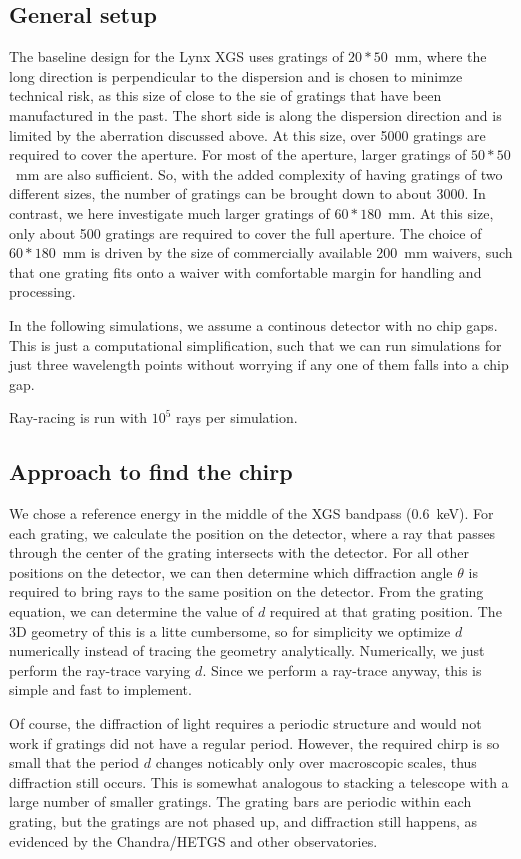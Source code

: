 \documentclass[]{spie}  %
\begin{document}
\subsection{General setup}
The baseline design for the Lynx XGS uses gratings of $20 * 50$~mm, where the long direction is perpendicular to the dispersion and is chosen to minimze technical risk, as this size of close to the sie of gratings that have been manufactured in the past. The short side is along the dispersion direction and is limited by the aberration discussed above. At this size, over 5000 gratings are required to cover the aperture. For most of the aperture, larger gratings of $50*50$~mm are also sufficient\cite{CATXGS}. So, with the added complexity of having gratings of two different sizes, the number of gratings can be brought down to about 3000. In contrast, we here investigate much larger gratings of $60 * 180$~mm. At this size, only about 500 gratings are required to cover the full aperture. The choice of $60 * 180$~mm is driven by the size of commercially available 200~mm waivers, such that one grating fits onto a waiver with comfortable margin for handling and processing.

In the following simulations, we assume a continous detector with no chip gaps. This is just a computational simplification, such that we can run simulations for just three wavelength points without worrying if any one of them falls into a chip gap.

Ray-racing is run with $10^5$ rays per simulation.


\subsection{Approach to find the chirp}
We chose a reference energy in the middle of the XGS bandpass (0.6~keV). 
For each grating, we calculate the position on the detector, where a ray that passes through the center of the grating intersects with the detector. For all other positions on the detector, we can then determine which diffraction angle $\theta$ is required to bring rays to the same position on the detector. From the grating equation, we can determine the value of $d$ required at that grating position. The 3D geometry of this is a litte cumbersome, so for simplicity we optimize $d$ numerically instead of tracing the geometry analytically. Numerically, we just perform the ray-trace varying $d$. Since we perform a ray-trace anyway, this is simple and fast to implement.

Of course, the diffraction of light requires a periodic structure and would not work if gratings did not have a regular period. However, the required chirp is so small that the period $d$ changes noticably only over macroscopic scales, thus diffraction still occurs. This is somewhat analogous to stacking a telescope with a large number of smaller gratings. The grating bars are periodic within each grating, but the gratings are not phased up, and diffraction still happens, as evidenced by the Chandra/HETGS and other observatories.
\end{document}
